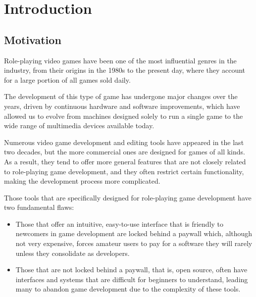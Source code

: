 \chapter*{Introduction}
\label{cap:introduction}



\section*{Motivation}
Role-playing video games have been one of the most influential genres in the industry, from their origins in the 1980s to the present day, where they account for a large portion of all games sold daily.

\smallskip

The development of this type of game has undergone major changes over the years, driven by continuous hardware and software improvements, which have allowed us to evolve from machines designed solely to run a single game to the wide range of multimedia devices available today.

\medskip

Numerous video game development and editing tools have appeared in the last two decades, but the more commercial ones are designed for games of all kinds. As a result, they tend to offer more general features that are not closely related to role-playing game development, and they often restrict certain functionality, making the development process more complicated.

\smallskip

Those tools that are specifically designed for role-playing game development have two fundamental flaws:
\begin{itemize}
	\item Those that offer an intuitive, easy-to-use interface that is friendly to newcomers in game development are locked behind a paywall which, although not very expensive, forces amateur users to pay for a software they will rarely unless they consolidate as developers.
	\item Those that are not locked behind a paywall, that is, open source, often have interfaces and systems that are difficult for beginners to understand, leading many to abandon game development due to the complexity of these tools.
\end{itemize}

